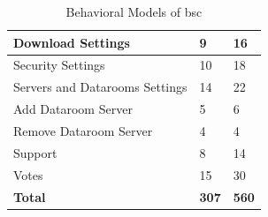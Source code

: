 \begin{table}[]
\begin{tabular}{|l|l|l|}
        \hline
        Download Settings & 9 & 16 \\
        \hline
        Security Settings & 10 & 18 \\
        \hline
        Servers and Datarooms Settings & 14 & 22 \\
        \hline
        Add Dataroom Server & 5 & 6 \\
        \hline
        Remove Dataroom Server & 4 & 4 \\
        \hline
        Support & 8 & 14 \\
        \hline
        Votes & 15 & 30 \\
        \hline
        \textbf{Total} & \textbf{307} & \textbf{560} \\
        \hline
    \end{tabular}
    \caption{Behavioral Models of \acrshort{bsc}}
    \label{tab:Behavioral_models}
\end{table}














